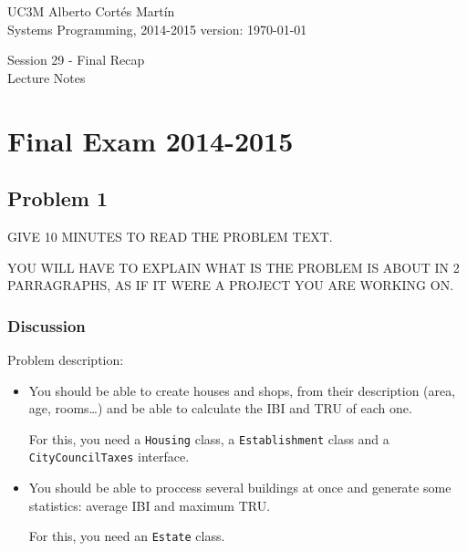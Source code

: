 \documentclass[a4paper, 9pt]{extarticle}
\newcommand{\realtitle}{Session 29 - Final Recap}
\begin{document}
\makebox[\linewidth]{\rule{\textwidth}{0.4pt}}
UC3M \hfill Alberto Cortés Martín\\
Systems Programming, 2014-2015 \hfill version: \today\\
\makebox[\linewidth]{\rule{\textwidth}{0.4pt}}
\begin{center}
  \Large{\realtitle}\\Lecture Notes
\end{center}
\makebox[\linewidth]{\rule{\textwidth}{0.4pt}}
\vspace{1cm}

\section{Final Exam 2014-2015}

\subsection{Problem 1}

GIVE 10 MINUTES TO READ THE PROBLEM TEXT.

YOU WILL HAVE TO EXPLAIN WHAT IS THE PROBLEM IS ABOUT IN 2 PARRAGRAPHS, AS IF
IT WERE A PROJECT YOU ARE WORKING ON.


\subsubsection{Discussion}

Problem description:
\begin{multicols}{2}
\begin{itemize}
  \item You should be able to create houses and shops, from their description
    (area, age, rooms\ldots) and be able to calculate the IBI and TRU of each
    one.

    For this, you need a \texttt{Housing} class, a \texttt{Establishment} class
    and a \texttt{CityCouncilTaxes} interface.
\end{itemize}

\columnbreak

\begin{itemize}
  \item You should be able to proccess several buildings at once and generate
    some statistics: average IBI and maximum TRU.

    For this, you need an \texttt{Estate} class.

\end{itemize}
\end{multicols}
\end{document}
